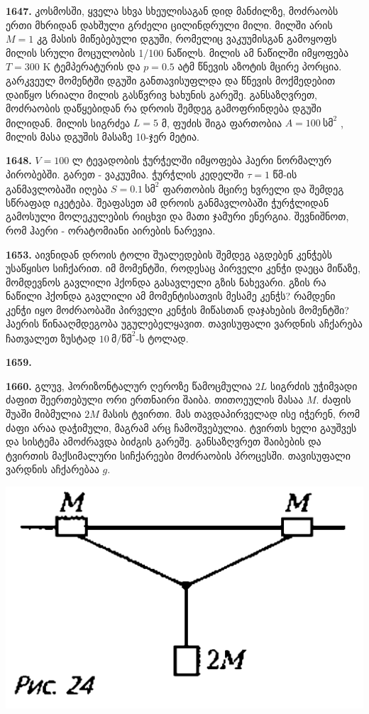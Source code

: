 \documentclass[12pt,a4paper,]{report}
\begin{document}
\textbf{1647.} კოსმოსში, ყველა სხვა სხეულისაგან დიდ მანძილზე, მოძრაობს ერთი მხრიდან დახშული გრძელი ცილინდრული მილი. მილში არის $M=1$ კგ მასის მიწებებული დგუში, რომელიც ვაკუუმისგან გამოყოფს მილის სრული მოცულობის 1/100 ნაწილს. მილის ამ ნაწილში იმყოფება $T=300$ K ტემპერატურის და $p=0.5$ ატმ წნევის აზოტის მცირე პორცია. გარკვეულ მომენტში დგუში განთავისუფლდა და წნევის მოქმედებით დაიწყო სრიალი მილის გასწვრივ ხახუნის გარეშე. განსაზღვრეთ, მოძრაობის დაწყებიდან რა დროის შემდეგ გამოფრინდება დგუში მილიდან. მილის სიგრძეა $L=5$ მ, ფუძის შიგა ფართობია $A=100\ \text{სმ}^2$ , მილის მასა დგუშის მასაზე 10-ჯერ მეტია.

\textbf{1648.} $V=100$ ლ ტევადობის ჭურჭელში იმყოფება ჰაერი ნორმალურ პირობებში. გარეთ - ვაკუუმია. ჭურჭლის კედელში $\tau=1$ წმ-ის განმავლობაში იღება $S=0.1\ \text{სმ}^2$ ფართობის მცირე ხვრელი და შემდეგ სწრაფად იკეტება. შეაფასეთ ამ დროის განმავლობაში ჭურჭლიდან გამოსული მოლეკულების რიცხვი და მათი ჯამური ენერგია. შევნიშნოთ, რომ ჰაერი - ორატომიანი აირების ნარევია.

\textbf{1653.} აივნიდან დროის ტოლი შუალედების შემდეგ აგდებენ კენჭებს უსაწყისო სიჩქარით. იმ მომენტში, როდესაც პირველი კენჭი დაეცა მიწაზე, მომდევნოს გავლილი ჰქონდა გასავლელი გზის ნახევარი. გზის რა ნაწილი ჰქონდა გავლილი ამ მომენტისათვის მესამე კენჭს? რამდენი კენჭი იყო მოძრაობაში პირველი კენჭის მიწასთან დაჯახების მომენტში? ჰაერის წინააღმდეგობა უგულებელყავით. თავისუფალი ვარდნის აჩქარება ჩათვალეთ ზუსტად $10\ \text{მ}/\text{წმ}^2$-ს ტოლად.

\textbf{1659.} 

\textbf{1660.} გლუვ, ჰორიზონტალურ ღეროზე წამოცმულია $2L$ სიგრძის უჭიმვადი ძაფით შეერთებული ორი ერთნაირი შაიბა. თითოეულის მასაა $M$. ძაფის შუაში მიბმულია $2M$ მასის ტვირთი. მას თავდაპირველად ისე იჭერენ, რომ ძაფი არაა დაჭიმული, მაგრამ არც ჩამოშვებულია. ტვირთს ხელი გაუშვეს და სისტემა ამოძრავდა ბიძგის გარეშე. განსაზღვრეთ შაიბების და ტვირთის მაქსიმალური სიჩქარეები მოძრაობის პროცესში. თავისუფალი ვარდნის აჩქარებაა $g$. 
		\begin{center}
			\includegraphics[scale=0.3]{images/1660.png}
		\end{center}
\end{document}
